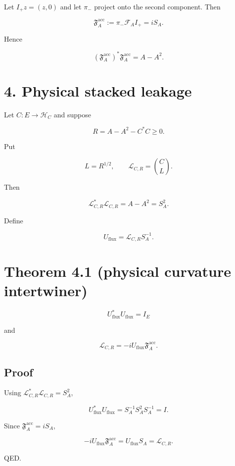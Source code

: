 Let \(I_+z=(z,0)\) and let \(\pi_-\) project onto the second component. Then

\[
\boxed{
\mathfrak F_A^{\mathrm{acc}}
:=\pi_-\mathcal F_AI_+
=iS_A.
}
\]

Hence

\[
\boxed{
(\mathfrak F_A^{\mathrm{acc}})^*
\mathfrak F_A^{\mathrm{acc}}
=A-A^2.
}
\]

\hypertarget{physical-stacked-leakage}{%
\section{4. Physical stacked leakage}\label{physical-stacked-leakage}}

Let \(C:E\to\mathcal H_C\) and suppose

\[
R=A-A^2-C^*C\ge0.
\]

Put

\[
L=R^{1/2},
\qquad
\mathcal L_{C,R}=\binom{C}{L}.
\]

Then

\[
\mathcal L_{C,R}^*\mathcal L_{C,R}=A-A^2=S_A^2.
\]

Define

\[
U_{\mathrm{flux}}=\mathcal L_{C,R}S_A^{-1}.
\]

\hypertarget{theorem-4.1-physical-curvature-intertwiner}{%
\section{Theorem 4.1 (physical curvature intertwiner)}\label{theorem-4.1-physical-curvature-intertwiner}}

\[
\boxed{U_{\mathrm{flux}}^*U_{\mathrm{flux}}=I_E}
\]

and

\[
\boxed{
\mathcal L_{C,R}
=-iU_{\mathrm{flux}}\mathfrak F_A^{\mathrm{acc}}.
}
\]

\hypertarget{proof}{%
\subsection{Proof}\label{proof}}

Using \(\mathcal L_{C,R}^*\mathcal L_{C,R}=S_A^2\),

\[
U_{\mathrm{flux}}^*U_{\mathrm{flux}}
=S_A^{-1}S_A^2S_A^{-1}=I.
\]

Since \(\mathfrak F_A^{\mathrm{acc}}=iS_A\),

\[
-iU_{\mathrm{flux}}\mathfrak F_A^{\mathrm{acc}}
=U_{\mathrm{flux}}S_A
=\mathcal L_{C,R}.
\]

QED.

